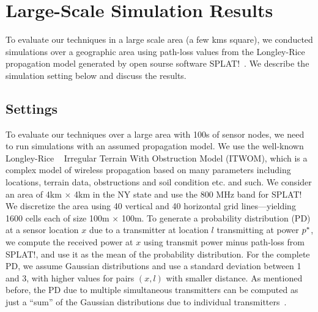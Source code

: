 \section{Large-Scale Simulation Results}
\label{sec:eval}

To evaluate our techniques in a large scale area (a few kms square),
we conducted simulations over a geographic area using path-loss values
from the Longley-Rice propagation model generated by
open sourse software SPLAT!~\cite{splat}. We describe the simulation setting below and
discuss the results.

\subsection{Settings}

 To evaluate our
techniques over a large area with 100s of sensor nodes, we need to run
simulations with an assumed propagation model. We use the well-known
Longley-Rice ~\cite{lr} Irregular Terrain With Obstruction Model (ITWOM), 
which is a complex model of wireless
propagation based on many parameters including locations, terrain
data, obstructions and soil condition etc. and such.
We consider an area of 4km $\times$ 4km in the NY state and use the
800 MHz band for SPLAT! We discretize the area using 40 vertical and
40 horizontal grid lines---yielding 1600 cells each of size 100m
$\times$ 100m.
To generate a probability distribution (PD) at a sensor location $x$
due to a transmitter at location $l$ transmitting at power $p^*$,
we compute the received power at $x$ using transmit power minus path-loss from SPLAT!, and use it as the mean of the probability distribution. For the
complete PD, we assume Gaussian distributions and use a standard
deviation between 1 and 3, with higher values for pairs $(x,l)$ with
smaller distance.
As mentioned before, the PD due to multiple simultaneous transmitters
can be computed as just a ``sum'' of the Gaussian distributions due to
individual transmitters~\cite{rappaport-2001,mobicom17-splot}.

